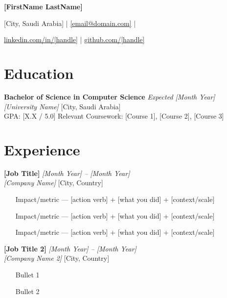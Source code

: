 \documentclass[11pt, a4paper]{article}
\newcommand{\cvitem}[4]{%
  \textbf{#1} \hfill \textit{#4} \\
  \textit{#2} \hfill #3 \\
}
\begin{document}
\pagestyle{empty}   %

\begin{center}
  {\LARGE \textbf{[FirstName LastName]}}

  \medskip

  [City, Saudi Arabia]
  \quad|\quad
  \href{mailto:[email@domain.com]}{[email@domain.com]}
  \quad|

  \smallskip

  \href{https://linkedin.com/in/[handle]}{linkedin.com/in/[handle]}
  \quad|\quad
  \href{https://github.com/[handle]}{github.com/[handle]}
\end{center}

\vspace{4pt}

\section{Education}

\cvitem
  {Bachelor of Science in Computer Science}
  {[University Name]}
  {[City, Saudi Arabia]}
  {Expected [Month Year]}

GPA: [X.X / 5.0] \quad Relevant Coursework: [Course 1], [Course 2], [Course 3]

\vspace{4pt}

\section{Experience}

\cvitem
  {[Job Title]}
  {[Company Name]}
  {[City, Country]}
  {[Month Year] -- [Month Year]}
\begin{itemize}
  \item [Impact/metric] — [action verb] + [what you did] + [context/scale]
  \item [Impact/metric] — [action verb] + [what you did] + [context/scale]
  \item [Impact/metric] — [action verb] + [what you did] + [context/scale]
\end{itemize}

\vspace{4pt}

\cvitem
  {[Job Title 2]}
  {[Company Name 2]}
  {[City, Country]}
  {[Month Year] -- [Month Year]}
\begin{itemize}
  \item [Bullet 1]
  \item [Bullet 2]
\end{itemize}
\end{document}
